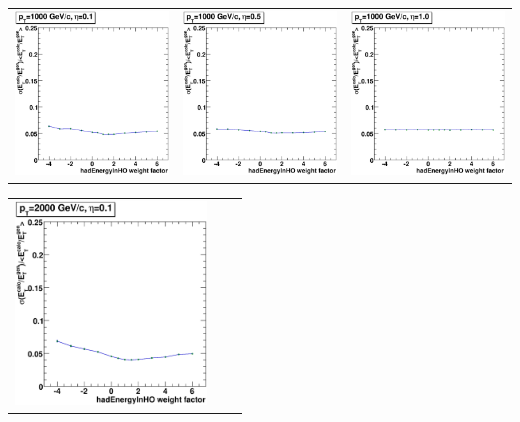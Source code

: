 \documentclass{cmspaper}
\begin{document}
\begin{appendices}
\begin{center}
\begin{tabular}{lll}
\end{tabular}
\end{center}
\begin{center}
\begin{tabular}{lll}
 \includegraphics[width=2in]{figs/ET_res_vs_HO_wght_eta0.1_pT1000.eps} &
 \includegraphics[width=2in]{figs/ET_res_vs_HO_wght_eta0.5_pT1000.eps} &
 \includegraphics[width=2in]{figs/ET_res_vs_HO_wght_eta1.0_pT1000.eps} \\
\end{tabular}
\end{center}
\begin{center}
\begin{tabular}{lll}
 \includegraphics[width=2in]{figs/ET_res_vs_HO_wght_eta0.1_pT2000.eps} &

\end{tabular}
\end{center}
\end{appendices}
\end{document}
